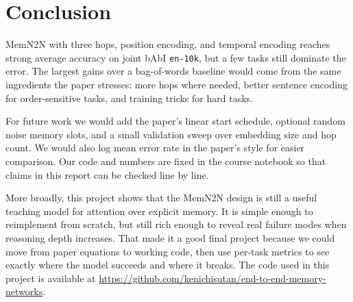 \documentclass{article}
\begin{document}
\section{Conclusion}

MemN2N with three hops, position encoding, and temporal encoding reaches strong average accuracy on joint bAbI \texttt{en-10k}, but a few tasks still dominate the error. The largest gains over a bag-of-words baseline would come from the same ingredients the paper stresses: more hops where needed, better sentence encoding for order-sensitive tasks, and training tricks for hard tasks.

For future work we would add the paper's linear start schedule, optional random noise memory slots, and a small validation sweep over embedding size and hop count. We would also log mean error rate in the paper's style for easier comparison. Our code and numbers are fixed in the course notebook so that claims in this report can be checked line by line.

More broadly, this project shows that the MemN2N design is still a useful teaching model for attention over explicit memory. It is simple enough to reimplement from scratch, but still rich enough to reveal real failure modes when reasoning depth increases. That made it a good final project because we could move from paper equations to working code, then use per-task metrics to see exactly where the model succeeds and where it breaks.
The code used in this project is available at \url{https://github.com/kenichisutan/end-to-end-memory-networks}.



\end{document}
